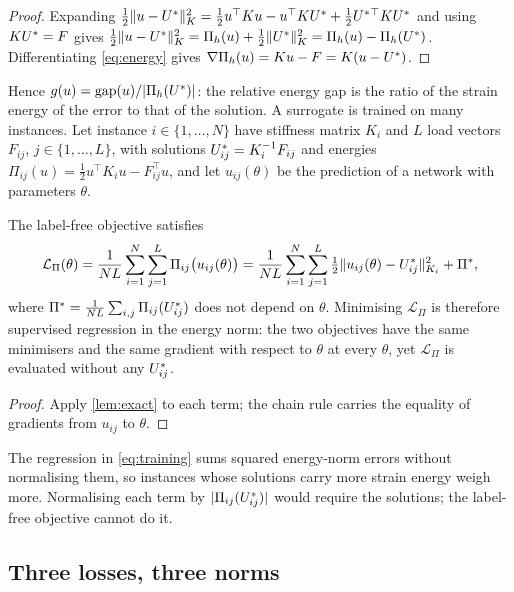 \begin{proof}
Expanding $\tfrac12\lVert u-U^{\ast}\rVert_K^2=\tfrac12u^{\top}Ku-u^{\top}KU^{\ast}
+\tfrac12U^{\ast}{}^{\top}KU^{\ast}$ and using $KU^{\ast}=F$ gives
$\tfrac12\lVert u-U^{\ast}\rVert_K^2=\Pi_h(u)+\tfrac12\lVert U^{\ast}\rVert_K^2=\Pi_h(u)-\Pi_h(U^{\ast})$.
Differentiating \eqref{eq:energy} gives $\nabla\Pi_h(u)=Ku-F=K(u-U^{\ast})$.
\end{proof}

Hence $g(u)=\operatorname{gap}(u)/\lvert\Pi_h(U^{\ast})\rvert$: the relative energy gap is the ratio of the
strain energy of the error to that of the solution. A surrogate is trained on many
instances. Let instance $i\in\{1,\dots,N\}$ have stiffness matrix $K_i$ and $L$ load
vectors $F_{ij}$, $j\in\{1,\dots,L\}$, with solutions $U^{\ast}_{ij}=K_i^{-1}F_{ij}$ and
energies $\Pi_{ij}(u)=\tfrac12u^{\top}K_iu-F_{ij}^{\top}u$, and let $u_{ij}(\theta)$ be the
prediction of a network with parameters $\theta$.

\begin{corollary}\label{cor:training}
The label-free objective satisfies
\begin{equation}
\mathcal{L}_{\Pi}(\theta) =
\frac{1}{NL}\sum_{i=1}^{N}\sum_{j=1}^{L}\Pi_{ij}\bigl(u_{ij}(\theta)\bigr) =
\frac{1}{NL}\sum_{i=1}^{N}\sum_{j=1}^{L}\tfrac12\lVert u_{ij}(\theta)-U^{\ast}_{ij}\rVert_{K_i}^{2}
+ \Pi^{\ast},
\label{eq:training}
\end{equation}
where $\Pi^{\ast}=\frac{1}{NL}\sum_{i,j}\Pi_{ij}(U^{\ast}_{ij})$ does not depend on $\theta$.
Minimising $\mathcal{L}_\Pi$ is therefore supervised regression in the energy norm: the
two objectives have the same minimisers and the same gradient with respect to $\theta$ at
every $\theta$, yet $\mathcal{L}_\Pi$ is evaluated without any $U^{\ast}_{ij}$.
\end{corollary}

\begin{proof}
Apply \cref{lem:exact} to each term; the chain rule carries the equality of gradients
from $u_{ij}$ to $\theta$.
\end{proof}

The regression in \eqref{eq:training} sums squared energy-norm errors without
normalising them, so instances whose solutions carry more strain energy weigh more.
Normalising each term by $\lvert\Pi_{ij}(U^{\ast}_{ij})\rvert$ would require the solutions;
the label-free objective cannot do it.

\subsection{Three losses, three norms}\label{sec:theory:norms}

